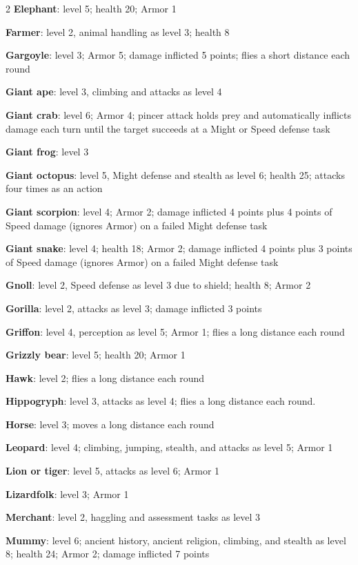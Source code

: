 \begin{multicols}{2}
\textbf{Elephant}: level 5; health 20; Armor 1

\textbf{Farmer}: level 2, animal handling as level 3; health 8

\textbf{Gargoyle}: level 3; Armor 5; damage inflicted 5 points; flies a short distance each round

\textbf{Giant ape}: level 3, climbing and attacks as level 4

\textbf{Giant crab}: level 6; Armor 4; pincer attack holds prey and automatically inflicts damage each turn until the target succeeds at a Might or Speed defense task

\textbf{Giant frog}: level 3

\textbf{Giant octopus}: level 5, Might defense and stealth as level 6; health 25; attacks four times as an action

\textbf{Giant scorpion}: level 4; Armor 2; damage inflicted 4 points plus 4 points of Speed damage (ignores Armor) on a failed Might defense task

\textbf{Giant snake}: level 4; health 18; Armor 2; damage inflicted 4 points plus 3 points of Speed damage (ignores Armor) on a failed Might defense task

\textbf{Gnoll}: level 2, Speed defense as level 3 due to shield; health 8; Armor 2

\textbf{Gorilla}: level 2, attacks as level 3; damage inflicted 3 points

\textbf{Griffon}: level 4, perception as level 5; Armor 1; flies a long distance each round

\textbf{Grizzly bear}: level 5; health 20; Armor 1

\textbf{Hawk}: level 2; flies a long distance each round

\textbf{Hippogryph}: level 3, attacks as level 4; flies a long distance each round.

\textbf{Horse}: level 3; moves a long distance each round

\textbf{Leopard}: level 4; climbing, jumping, stealth, and attacks as level 5; Armor 1

\textbf{Lion or tiger}: level 5, attacks as level 6; Armor 1

\textbf{Lizardfolk}: level 3; Armor 1

\textbf{Merchant}: level 2, haggling and assessment tasks as level 3

\textbf{Mummy}: level 6; ancient history, ancient religion, climbing, and stealth as level 8; health 24; Armor 2; damage inflicted 7 points


\end{multicols}
